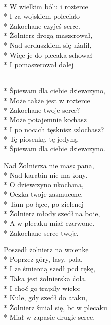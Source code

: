 \begin{lyrics}[longestline={Żołnierz śmiał się, bo w plecaku}]

\\*
W wielkim bólu i rozterce\\*
I za wojskiem poleciało\\*
Zakochane czyjeś serce.\\*
\smallskip
Żołnierz drogą maszerował,\\*
Nad serduszkiem się użalił,\\*
Więc je do plecaka schował\\*
I pomaszerował dalej.

\begin{chorus}
\\*
Śpiewam dla ciebie dziewczyno,\\*
Może także jest w rozterce\\*
Zakochane twoje serce?\\*
\smallskip
Może potajemnie kochasz\\*
I po nocach tęsknisz szlochasz?\\*
Tę piosenkę, tę jedyną,\\*
Śpiewam dla ciebie dziewczyno.
\end{chorus}

Nad Żołnierza nie masz pana,\\*
Nad karabin nie ma żony.\\*
O dziewczyno ukochana,\\*
Oczka twoje zasmucone.\\*
\smallskip
Tam po łące, po zielonej\\*
Żołnierz młody szedł na boje,\\*
A w plecaku miał czerwone.\\*
Zakochane serce twoje.

\chorusref

Poszedł żołnierz na wojenkę\\*
Poprzez góry, lasy, pola,\\*
I ze śmiercią szedł pod rękę,\\*
Taka jest żołnierska dola.\\*
\smallskip
I choć go trapiły wielce\\*
Kule, gdy szedł do ataku,\\*
Żołnierz śmiał się, bo w plecaku\\*
Miał w zapasie drugie serce.

\chorusref
\end{lyrics}




